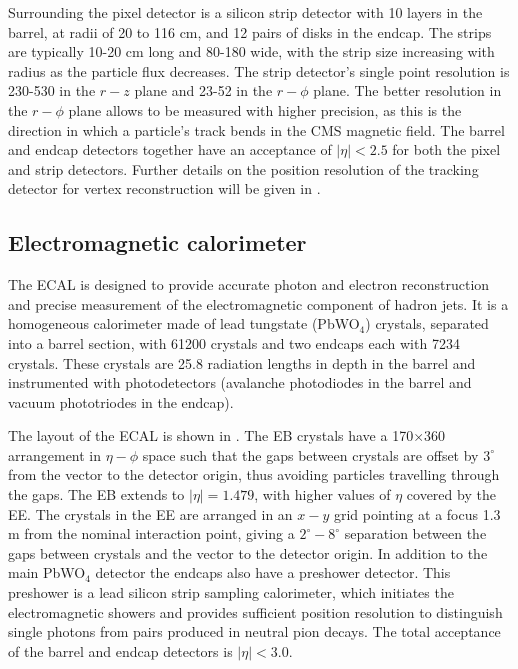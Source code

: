 Surrounding the pixel detector is a silicon strip detector with 10 layers in the barrel, at radii of 20 to 116 cm, and 12 pairs of disks in the endcap. The strips are typically 10-20 cm long and 80-180\,\micron\,wide, with the strip size increasing with radius as the particle flux decreases. The strip detector's single point resolution is 230-530\,\micron\,in the $r-z$ plane and 23-52\,\micron\,in the $r-\phi$ plane.  The better resolution in the $r-\phi$ plane allows \pt to be measured with higher precision, as this is the direction in which a particle's track bends in the CMS magnetic field. The barrel and endcap detectors together have an acceptance of $|\eta|<2.5$ for both the pixel and strip detectors. Further details on the position resolution of the tracking detector for vertex reconstruction will be given in .

\subsection{Electromagnetic calorimeter}
\label{sec:ECAL}
The \ac{ECAL} is designed to provide accurate photon and electron reconstruction and precise measurement of the electromagnetic component of hadron jets. It is a homogeneous calorimeter made of lead tungstate (PbWO$_{4}$) crystals, separated into a barrel section, with 61200 crystals and two endcaps each with 7234 crystals. These crystals are 25.8 radiation lengths in depth in the barrel and instrumented with photodetectors (avalanche photodiodes in the barrel and vacuum phototriodes in the endcap). 

The layout of the \ac{ECAL} is shown in . The \ac{EB} crystals have a 170$\times$360 arrangement in $\eta-\phi$ space such that the gaps between crystals are offset by $3^{\circ}$ from the vector to the detector origin, thus avoiding particles travelling through the gaps. The \ac{EB} extends to $|\eta|=1.479$, with higher values of $\eta$ covered by the \ac{EE}. The crystals in the \ac{EE} are arranged in an $x-y$ grid pointing at a focus 1.3\,m from the nominal interaction point, giving a $2^{\circ}-8^{\circ}$ separation between the gaps between crystals and the vector to the detector origin. In addition to the main PbWO$_{4}$ detector the endcaps also have a preshower detector. This preshower is a lead silicon strip sampling calorimeter, which initiates the electromagnetic showers and provides sufficient position resolution to distinguish single photons from pairs produced in neutral pion decays. The total acceptance of the barrel and endcap detectors is $|\eta|<3.0$.

